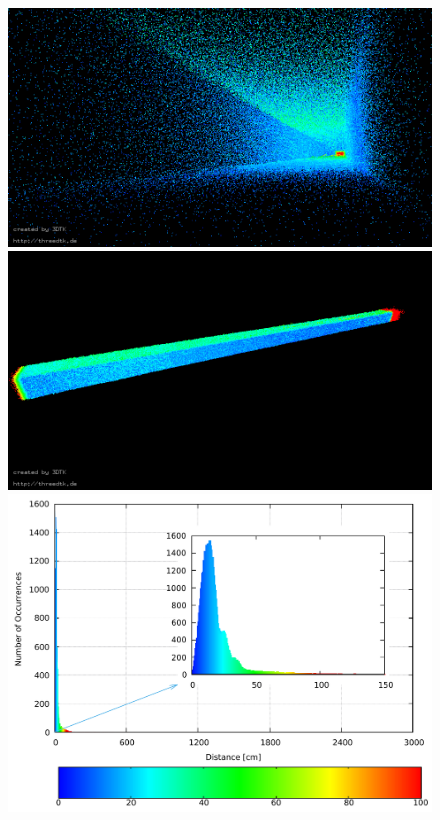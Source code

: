 \documentclass[5p]{elsarticle}
\begin{document}
\begin{figure}
\begin{minipage}[c]{0.495\textwidth}
  	\end{minipage}\hfill
  	\begin{minipage}[c]{0.495\textwidth}
  		\centering
		\includegraphics[width=\textwidth]{./images/corr_bottom_pose}\\
		\includegraphics[width=\textwidth]{./images/corr_side_view}\\
  		\includegraphics[width=\textwidth]{./images/corr_hist}

\end{minipage}
\end{figure}
\end{document}

